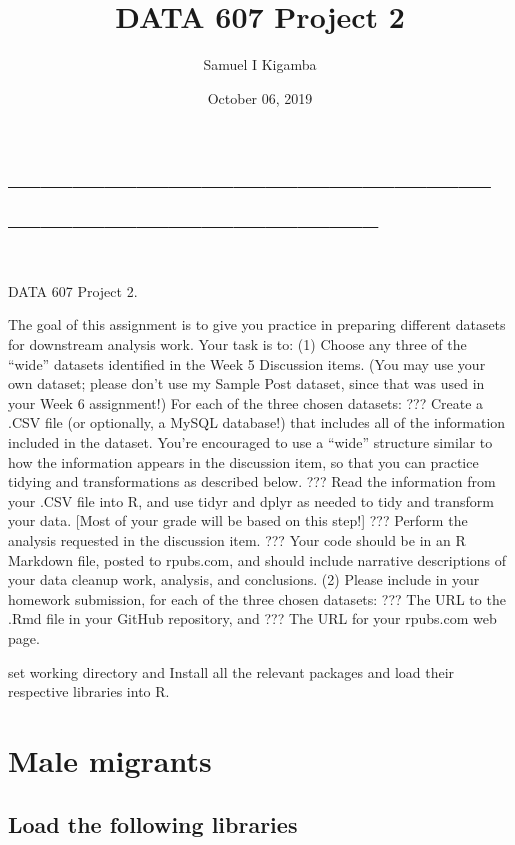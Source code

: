 \documentclass[]{article}
\title{DATA 607 Project 2}
\author{Samuel I Kigamba}
\date{October 06, 2019}
\begin{document}
\maketitle

{
\setcounter{tocdepth}{2}
\tableofcontents
}
\section{--------------------------------------------------------------------------------}\label{section}

\section{\texorpdfstring{\clearpage}{}}\label{section-1}

DATA 607 Project 2.

The goal of this assignment is to give you practice in preparing
different datasets for downstream analysis work. Your task is to: (1)
Choose any three of the ``wide'' datasets identified in the Week 5
Discussion items. (You may use your own dataset; please don't use my
Sample Post dataset, since that was used in your Week 6 assignment!) For
each of the three chosen datasets: ??? Create a .CSV file (or
optionally, a MySQL database!) that includes all of the information
included in the dataset. You're encouraged to use a ``wide'' structure
similar to how the information appears in the discussion item, so that
you can practice tidying and transformations as described below. ???
Read the information from your .CSV file into R, and use tidyr and dplyr
as needed to tidy and transform your data. {[}Most of your grade will be
based on this step!{]} ??? Perform the analysis requested in the
discussion item. ??? Your code should be in an R Markdown file, posted
to rpubs.com, and should include narrative descriptions of your data
cleanup work, analysis, and conclusions. (2) Please include in your
homework submission, for each of the three chosen datasets: ??? The URL
to the .Rmd file in your GitHub repository, and ??? The URL for your
rpubs.com web page.

set working directory and Install all the relevant packages and load
their respective libraries into R.

\section{Male migrants}\label{male-migrants}

\subsection{Load the following
libraries}\label{load-the-following-libraries}
\end{document}
